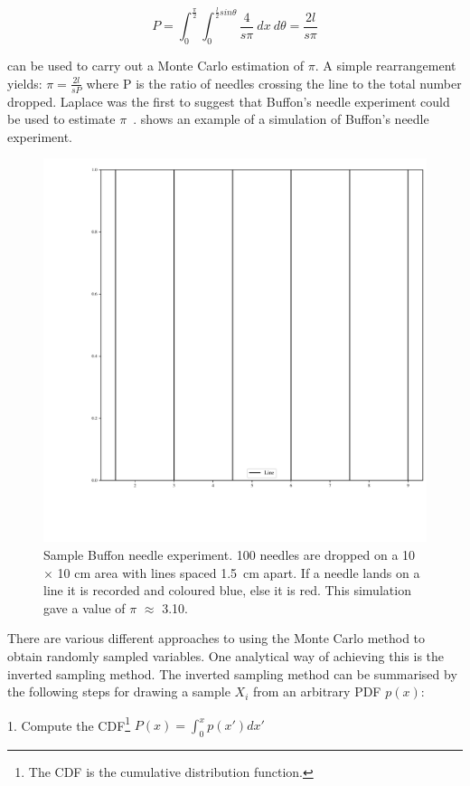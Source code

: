 \begin{equation}
P=\int_0^{\frac{\pi}{2}}\int_0^{\frac{l}{2}sin\theta}\frac{4}{s\pi}\ dx\ d\theta = \frac{2 l}{s \pi}\label{eqn:buffon}
\end{equation}


 can be used to carry out a Monte Carlo estimation of $\pi$. A simple rearrangement yields: $\pi = \tfrac{2l}{sP}$ where P is the ratio of needles crossing the line to the total number dropped. Laplace was the first to suggest that Buffon's needle experiment could be used to estimate $\pi$~\cite{beckmann2015history}. 
 shows an example of a simulation of Buffon's needle experiment.

\begin{figure}[!htb]
\centering
\includegraphics[width=.65\textwidth]{buffon.pdf}
\caption{Sample Buffon needle experiment. 100 needles are dropped on a 10 $\times$ 10 cm area with lines spaced 1.5~cm apart. If a needle lands on a line it is recorded and coloured blue, else it is red. This simulation gave a value of $\pi$ $\approx$ 3.10.}
\label{fig:buffon-needle}
\end{figure}

There are various different approaches to using the Monte Carlo method to obtain randomly sampled variables.
One analytical way of achieving this is the inverted sampling method.
The inverted sampling method can be summarised by the following steps for drawing a sample $X_i$ from an arbitrary PDF $p(x)$:

\medskip

1. Compute the CDF\footnote{The CDF is the cumulative distribution function.} $P(x)=\int^{x}_{0}p(x')dx'$

